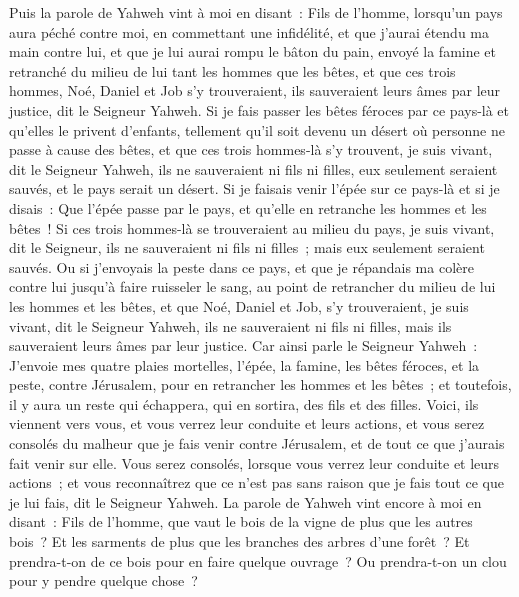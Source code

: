 \begin{multicols}{2}
Puis la parole de Yahweh vint à moi en disant~:
Fils de l'homme, lorsqu'un pays aura péché contre moi, en commettant une infidélité, et que j'aurai étendu ma main contre lui, et que je lui aurai rompu le bâton du pain, envoyé la famine et retranché du milieu de lui tant les hommes que les bêtes,
et que ces trois hommes, Noé, Daniel et Job s'y trouveraient, ils sauveraient leurs âmes par leur justice, dit le Seigneur Yahweh.
Si je fais passer les bêtes féroces par ce pays-là et qu'elles le privent d'enfants, tellement qu'il soit devenu un désert où personne ne passe à cause des bêtes,
et que ces trois hommes-là s'y trouvent, je suis vivant, dit le Seigneur Yahweh, ils ne sauveraient ni fils ni filles, eux seulement seraient sauvés, et le pays serait un désert.
Si je faisais venir l'épée sur ce pays-là et si je disais~: Que l'épée passe par le pays, et qu'elle en retranche les hommes et les bêtes~!
Si ces trois hommes-là se trouveraient au milieu du pays, je suis vivant, dit le Seigneur, ils ne sauveraient ni fils ni filles~; mais eux seulement seraient sauvés.
Ou si j'envoyais la peste dans ce pays, et que je répandais ma colère contre lui jusqu'à faire ruisseler le sang, au point de retrancher du milieu de lui les hommes et les bêtes,
et que Noé, Daniel et Job, s'y trouveraient, je suis vivant, dit le Seigneur Yahweh, ils ne sauveraient ni fils ni filles, mais ils sauveraient leurs âmes par leur justice.
Car ainsi parle le Seigneur Yahweh~: J'envoie mes quatre plaies mortelles, l'épée, la famine, les bêtes féroces, et la peste, contre Jérusalem, pour en retrancher les hommes et les bêtes~;
et toutefois, il y aura un reste qui échappera, qui en sortira, des fils et des filles. Voici, ils viennent vers vous, et vous verrez leur conduite et leurs actions, et vous serez consolés du malheur que je fais venir contre Jérusalem, et de tout ce que j'aurais fait venir sur elle.
Vous serez consolés, lorsque vous verrez leur conduite et leurs actions~; et vous reconnaîtrez que ce n'est pas sans raison que je fais tout ce que je lui fais, dit le Seigneur Yahweh.
\VerseOne{}La parole de Yahweh vint encore à moi en disant~:
Fils de l'homme, que vaut le bois de la vigne de plus que les autres bois~? Et les sarments de plus que les branches des arbres d'une forêt~?
Et prendra-t-on de ce bois pour en faire quelque ouvrage~? Ou prendra-t-on un clou pour y pendre quelque chose~?

\end{multicols}
